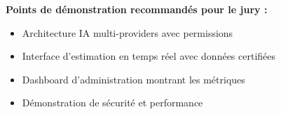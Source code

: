 \textbf{Points de démonstration recommandés pour le jury :}
\begin{itemize}
    \item Architecture IA multi-providers avec permissions
    \item Interface d'estimation en temps réel avec données certifiées
    \item Dashboard d'administration montrant les métriques
    \item Démonstration de sécurité et performance
\end{itemize}